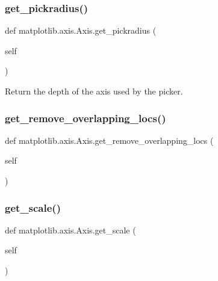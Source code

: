 \subsubsection{\texorpdfstring{get\+\_\+pickradius()}{get\_pickradius()}}
{\footnotesize\ttfamily def matplotlib.\+axis.\+Axis.\+get\+\_\+pickradius (\begin{DoxyParamCaption}\item[{}]{self }\end{DoxyParamCaption})}

\begin{DoxyVerb}Return the depth of the axis used by the picker.\end{DoxyVerb}
 \mbox{\label{classmatplotlib_1_1axis_1_1Axis_acfa2fdfbeb414170cf0ea56b3fadc28a}} 
\subsubsection{\texorpdfstring{get\+\_\+remove\+\_\+overlapping\+\_\+locs()}{get\_remove\_overlapping\_locs()}}
{\footnotesize\ttfamily def matplotlib.\+axis.\+Axis.\+get\+\_\+remove\+\_\+overlapping\+\_\+locs (\begin{DoxyParamCaption}\item[{}]{self }\end{DoxyParamCaption})}

\mbox{\label{classmatplotlib_1_1axis_1_1Axis_aeefde767e7d2d7e326265498df42898b}} 
\subsubsection{\texorpdfstring{get\+\_\+scale()}{get\_scale()}}
{\footnotesize\ttfamily def matplotlib.\+axis.\+Axis.\+get\+\_\+scale (\begin{DoxyParamCaption}\item[{}]{self }\end{DoxyParamCaption})}

